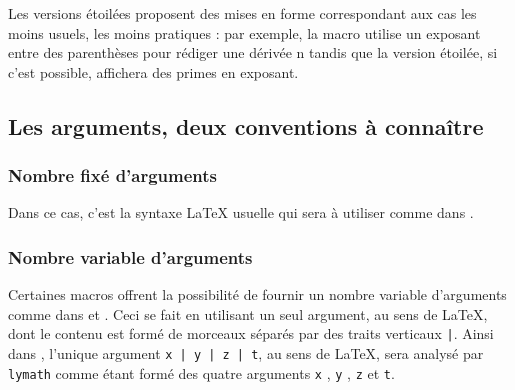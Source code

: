 \documentclass[12pt,a4paper]{article}
\begin{document}
Les versions étoilées proposent des mises en forme correspondant aux cas les moins usuels, les moins pratiques : par exemple, la macro  utilise un exposant entre des parenthèses pour rédiger une dérivée n\ieme{} tandis que la version étoilée, si c'est possible, affichera des primes en exposant.




\subsection{Les arguments, deux conventions à connaître}

\subsubsection{Nombre fixé d'arguments}

Dans ce cas, c'est la syntaxe \LaTeX{} usuelle qui sera à utiliser comme dans .




\subsubsection{Nombre variable d'arguments}

Certaines macros offrent la possibilité de fournir un nombre variable d'arguments comme dans  et .
Ceci se fait en utilisant un seul argument, au sens de \LaTeX{}, dont le contenu est formé de morceaux séparés par des traits verticaux \verb+|+.
Ainsi dans , l'unique argument \verb+x | y | z | t+, au sens de \LaTeX{}, sera analysé par \verb+lymath+ comme étant formé des quatre arguments \verb+x+ , \verb+y+ , \verb+z+ et \verb+t+.
\end{document}
